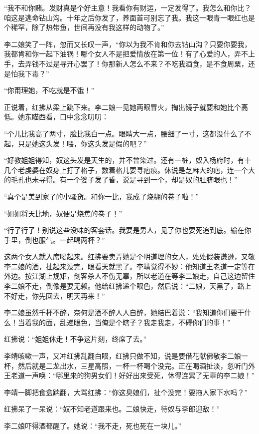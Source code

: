 “我不和你赌。发财真是个好主意！我看你有财运，一定发得了。我怎么和你比？咱这是逃命钻山沟。十年之后你发了，养面首可别忘了我。我这一眼青一眼红也是个稀罕，除了热带鱼，世间再没有我这样的动物了。”

李二娘笑了一阵，忽而又长叹一声，“你以为我不肯和你去钻山沟？只要你要我，我都肯和你一起下油锅！哪个女人不是把爱情放在第一位！有了心爱的人，弄不上手，去弄钱不过是寻开心罢了！你那新人怎么不来？不吃我酒食，是不食周粟，还是怕我下毒？”

“你甭理她，不吃就是不饿！”

正说着，红拂从梁上跳下来。李二娘一见她两眼冒火，掏出镜子就要和她比个高低。她东瞄西看，口中念念叨叨：

“个儿比我高了两寸，脸比我白一点。眼睛大一点，腰细了一寸，这都没什么了不起，只是她这头发！喂，你这头发是假的吧？”

“好教姐姐得知，奴这头发是天生的，并不曾染过。还有一桩，奴入杨府时，有十几个老虔婆在奴身上打了格子，数着格儿要寻疤痕。休说是芝麻大的疤，连一个大的毛孔也未寻得。有一个婆子发了昏，说是寻到一个，却是奴的肚脐眼也！”

“真个是美到家了的小骚货。和你一比，我成了烧糊的卷子啦！”

“姐姐将天比地，奴便是烧焦的卷子！”

“行了行了！别说这些没味的客套话。我要是男人，见了你也要死追到底。输在你手里，倒也服气。一起喝两杯？”

这两个女人就入席喝起来。红拂要卖弄她是个明道理的女人，处处假装谦逊，又敬李二娘的酒，扯起来没完，眼看天就黑了。李靖觉得不妙：他知道王老道一定等在外边。按江湖上规矩，剑客杀人不伤无辜，所以老道在等李二娘走，自己这边留住李二娘不走，倒像是耍无赖。他给红拂递个眼色，然后说：“二娘，天黑了，路上不好走，你先回去，明天再来！”

李二娘虽然千杯不醉，奈何是酒不醉人人自醉，她结巴着说：“我知道你们要干什么！当着我的面，乱递眼色，当俺是个瞎子？我走我走，不碍你们的事！”

红拂说：“姐姐休走！不争这片刻，终席了去。”

李靖咳嗽一声，又冲红拂乱翻白眼，红拂只做不知，说是要借花献佛敬李二娘一杯，然后就是二龙出水，三星高照，一杯一杯喝个没完。正在喝酒扯淡，忽听门外王老道一声唤：“哪里来的狗男女们！好好出来受死，休得连累了无辜的李二娘！”

李靖一脚把食盒踹翻，大骂红拂：“你这臭娘们，扯个没完！要拖人家下水吗？”

红拂呆了一呆说：“奴不知老道跟来也。二娘快走，待奴与李郎迎敌！”

李二娘吓得酒都醒了。她说：“我不走，死也死在一块儿。”

